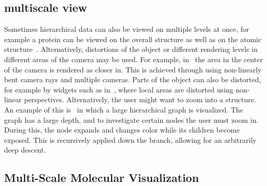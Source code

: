 \documentclass[review,journal]{vgtc}         %
\begin{document}
%
%




\subsection{multiscale view}
Sometimes hierarchical data can also be viewed on multiple levels at once, for example a protein can be viewed on the overall structure as well as on the atomic structure~\cite{OrderIndependent}. 
Alternatively, distortions of the object or different rendering levels in different areas of the camera may be used. 
For example, in~\cite{MultiscaleViews} the area in the center of the camera is rendered as closer in. 
This is achieved through using non-linearly bent camera rays and multiple cameras. Parts of the object can also be distorted, for example by widgets such as in~\cite{PerspectiveWidgets}, where local areas are distorted using non-linear perspectives. Alternatively, the user might want to zoom into a structure. An example of this is~\cite{LexicalNetworks} in which a large hierarchical graph is visualized. The graph has a large depth, and to investigate certain nodes the user must zoom in. During this, the node expands and changes color while its children become exposed. This is recursively applied down the branch, allowing for an arbitrarily deep descent.


\subsection{Multi-Scale Molecular Visualization}
\end{document}
